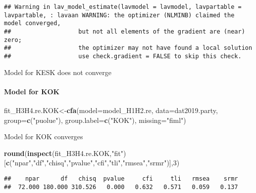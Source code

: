 \documentclass[
]{article}
\newenvironment{Shaded}{\begin{snugshade}}{\end{snugshade}}
\newcommand{\DataTypeTok}[1]{\textcolor[rgb]{0.13,0.29,0.53}{#1}}
\newcommand{\DecValTok}[1]{\textcolor[rgb]{0.00,0.00,0.81}{#1}}
\newcommand{\KeywordTok}[1]{\textcolor[rgb]{0.13,0.29,0.53}{\textbf{#1}}}
\newcommand{\NormalTok}[1]{#1}
\newcommand{\StringTok}[1]{\textcolor[rgb]{0.31,0.60,0.02}{#1}}
\begin{document}
\begin{verbatim}
## Warning in lav_model_estimate(lavmodel = lavmodel, lavpartable = lavpartable, : lavaan WARNING: the optimizer (NLMINB) claimed the model converged,
##                   but not all elements of the gradient are (near) zero;
##                   the optimizer may not have found a local solution
##                   use check.gradient = FALSE to skip this check.
\end{verbatim}

Model for KESK does not converge

\newpage

\hypertarget{model-for-kok}{%
\paragraph{Model for KOK}\label{model-for-kok}}

\begin{Shaded}
\begin{Highlighting}[]
\NormalTok{fit_H3H4.re.KOK<-}\KeywordTok{cfa}\NormalTok{(}\DataTypeTok{model=}\NormalTok{model_H1H2.re,}
                    \DataTypeTok{data=}\NormalTok{dat2019.party,}
                    \DataTypeTok{group=}\KeywordTok{c}\NormalTok{(}\StringTok{"puolue"}\NormalTok{),}
                    \DataTypeTok{group.label=}\KeywordTok{c}\NormalTok{(}\StringTok{"KOK"}\NormalTok{),}
                    \DataTypeTok{missing=}\StringTok{"fiml"}\NormalTok{)}
\end{Highlighting}
\end{Shaded}

Model for KOK converges

\begin{Shaded}
\begin{Highlighting}[]
\KeywordTok{round}\NormalTok{(}\KeywordTok{inspect}\NormalTok{(fit_H3H4.re.KOK,}\StringTok{"fit"}\NormalTok{)}
\NormalTok{      [}\KeywordTok{c}\NormalTok{(}\StringTok{"npar"}\NormalTok{,}\StringTok{"df"}\NormalTok{,}\StringTok{"chisq"}\NormalTok{,}\StringTok{"pvalue"}\NormalTok{,}\StringTok{"cfi"}\NormalTok{,}\StringTok{"tli"}\NormalTok{,}\StringTok{"rmsea"}\NormalTok{,}\StringTok{"srmr"}\NormalTok{)],}\DecValTok{3}\NormalTok{)}
\end{Highlighting}
\end{Shaded}

\begin{verbatim}
##    npar      df   chisq  pvalue     cfi     tli   rmsea    srmr 
##  72.000 180.000 310.526   0.000   0.632   0.571   0.059   0.137
\end{verbatim}
\end{document}
